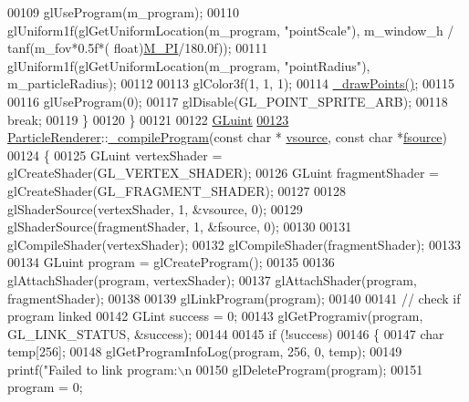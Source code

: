 \begin{DoxyCode}
00109             glUseProgram(m\_program);
00110             glUniform1f(glGetUniformLocation(m\_program, \textcolor{stringliteral}{"pointScale"}), m\_window\_h / tanf(m\_fov*0.5f*(\textcolor{keywordtype}{
      float})\hyperlink{render__particles_8cpp_ae71449b1cc6e6250b91f539153a7a0d3}{M\_PI}/180.0f));
00111             glUniform1f(glGetUniformLocation(m\_program, \textcolor{stringliteral}{"pointRadius"}), m\_particleRadius);
00112 
00113             glColor3f(1, 1, 1);
00114             \hyperlink{class_particle_renderer_a2683c43c010bff7973a977c1953f2bd6}{\_drawPoints}\hyperlink{class_particle_renderer_a2683c43c010bff7973a977c1953f2bd6}{(}\hyperlink{class_particle_renderer_a2683c43c010bff7973a977c1953f2bd6}{)};
00115 
00116             glUseProgram(0);
00117             glDisable(GL\_POINT\_SPRITE\_ARB);
00118             \textcolor{keywordflow}{break};
00119     \}
00120 \}
00121 
00122 \hyperlink{class_particle_renderer_a3a7af352d38734b6bfa425e3b207d60b}{GLuint}
\hypertarget{render__particles_8cpp_source_l00123}{}\hyperlink{class_particle_renderer_a3a7af352d38734b6bfa425e3b207d60b}{00123} \hyperlink{class_particle_renderer}{ParticleRenderer}::\hyperlink{class_particle_renderer_a3a7af352d38734b6bfa425e3b207d60b}{\_compileProgram}(\textcolor{keyword}{const} \textcolor{keywordtype}{char} *
      \hyperlink{class_particle_renderer_a3a7af352d38734b6bfa425e3b207d60b}{vsource}, \textcolor{keyword}{const} \textcolor{keywordtype}{char} *\hyperlink{class_particle_renderer_a3a7af352d38734b6bfa425e3b207d60b}{fsource})
00124 \{
00125     GLuint vertexShader = glCreateShader(GL\_VERTEX\_SHADER);
00126     GLuint fragmentShader = glCreateShader(GL\_FRAGMENT\_SHADER);
00127 
00128     glShaderSource(vertexShader, 1, &vsource, 0);
00129     glShaderSource(fragmentShader, 1, &fsource, 0);
00130 
00131     glCompileShader(vertexShader);
00132     glCompileShader(fragmentShader);
00133 
00134     GLuint program = glCreateProgram();
00135 
00136     glAttachShader(program, vertexShader);
00137     glAttachShader(program, fragmentShader);
00138 
00139     glLinkProgram(program);
00140 
00141     \textcolor{comment}{// check if program linked}
00142     GLint success = 0;
00143     glGetProgramiv(program, GL\_LINK\_STATUS, &success);
00144 
00145     \textcolor{keywordflow}{if} (!success)
00146     \{
00147         \textcolor{keywordtype}{char} temp[256];
00148         glGetProgramInfoLog(program, 256, 0, temp);
00149         printf(\textcolor{stringliteral}{"Failed to link program:\(\backslash\)n%
00150         glDeleteProgram(program);
00151         program = 0;
}
\end{DoxyCode}

